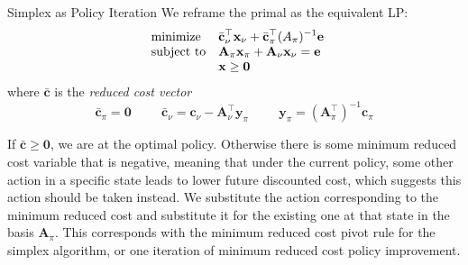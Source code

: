 \documentclass{beamer}
\renewcommand{\vec}[1]{\mathbf{#1}}
\begin{document}

\begin{frame}{Simplex as Policy Iteration}
We reframe the primal as the equivalent LP:
\begin{equation*}
\begin{array}{ll@{}ll}
\text{minimize}  & \displaystyle \bar{\vec{c}}_{\nu}^\top\vec{x}_{\nu} + \bar{\vec{c}}_{\pi}^\top (A_\pi)^{-1}\vec{e}\\
\text{subject to}& \displaystyle \vec{A}_{\pi}\vec{x}_{\pi} + 
\vec{A}_{\nu}\vec{x}_{\nu} =\vec{e}\\
                         &  \displaystyle\vec{x}\geq\vec{0}
\end{array}
\end{equation*}
where $\bar{\vec{c}}$ is the \textit{reduced cost vector} $$\bar{\vec{c}}_{\pi} = \vec{0} \hspace{1cm} \bar{\vec{c}}_{\nu} =
\vec{c}_{\nu} - \vec{A}_{\nu}^\top\vec{y}_{\pi} \hspace{1cm} \vec{y}_{\pi} = (\vec{A}_{\pi}^\top)^{-1}\vec{c}_{\pi} $$

\iffalse
In linear programming, $\bar{\vec{c}}$ is called the \textit{reduced cost} vector, and expresses the change needed in the constraint coefficients in order for that variable to be included in the BFS. We can also view this as advantage.
\fi

 If  $\bar{\vec{c}} \geq \vec{0}$, we are at the optimal policy. Otherwise there is some minimum reduced cost variable that is negative, meaning that under the current policy, some other action in a specific state leads to lower future discounted cost, which suggests this action should be taken instead. We substitute the action corresponding to the minimum reduced cost and substitute it for the existing one at that state in the basis $\vec{A}_{\pi}$. This corresponds with the minimum reduced cost pivot rule for the simplex algorithm, or 
 one iteration of minimum reduced cost policy improvement.

\end{frame}
\end{document}
